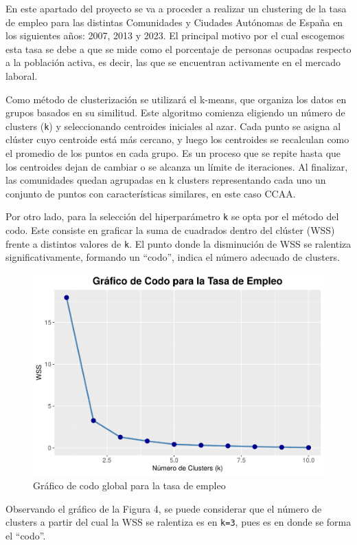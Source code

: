 \documentclass[Universitat de
València,article,submit,moreauthors,pdftex]{Definitions/mdpi}
\begin{document}
En este apartado del proyecto se va a proceder a realizar un clustering
de la tasa de empleo para las distintas Comunidades y Ciudades Autónomas
de España en los siguientes años: 2007, 2013 y 2023. El principal motivo
por el cual escogemos esta tasa se debe a que se mide como el porcentaje
de personas ocupadas respecto a la población activa, es decir, las que
se encuentran activamente en el mercado laboral.

Como método de clusterización se utilizará el k-means, que organiza los
datos en grupos basados en su similitud. Este algoritmo comienza
eligiendo un número de clusters (\texttt{k}) y seleccionando centroides
iniciales al azar. Cada punto se asigna al clúster cuyo centroide está
más cercano, y luego los centroides se recalculan como el promedio de
los puntos en cada grupo. Es un proceso que se repite hasta que los
centroides dejan de cambiar o se alcanza un límite de iteraciones. Al
finalizar, las comunidades quedan agrupadas en k clusters representando
cada uno un conjunto de puntos con características similares, en este
caso CCAA.

Por otro lado, para la selección del hiperparámetro \texttt{k} se opta
por el método del codo. Este consiste en graficar la suma de cuadrados
dentro del clúster (WSS) frente a distintos valores de \texttt{k}. El
punto donde la disminución de WSS se ralentiza significativamente,
formando un ``codo'', indica el número adecuado de clusters.\newline

\begin{figure}[h]

{\centering \includegraphics[width=0.4\linewidth]{ProyectoAED2024_files/figure-latex/unnamed-chunk-34-1} 

}

\caption{Gráfico de codo global para la tasa de empleo}\label{fig:unnamed-chunk-34}
\end{figure}

Observando el gráfico de la Figura 4, se puede considerar que el número
de clusters a partir del cual la WSS se ralentiza es en \texttt{k=3},
pues es en donde se forma el ``codo''.
\end{document}
